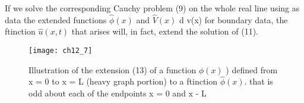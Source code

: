 \documentclass[../main.tex]{subfiles}
\begin{document}
If we solve the corresponding Cauchy problem (9) on the whole real line using as
data the extended functions $\hat{\phi}(x)$ and $\hat{V}(x)$ d v(x) for boundary data, the ftinction $\hat{u}(x,t)$ that arises will, in fact, extend the solution of (11). 


\begin{figure}[H]
	\centering
	\texttt{[image: ch12\_7]}
	\caption{\textsf{  Illustration of the extension (13) of a function $\phi(x)$ ) defined from x = 0 to x
= L (heavy graph portion) to a ftinction $\hat{\phi}(x)$. that is odd about each of the endpoints x = 0
and x - L }}
	\label{pfig:ch12_7}
\end{figure}
\newpage
\end{document}

